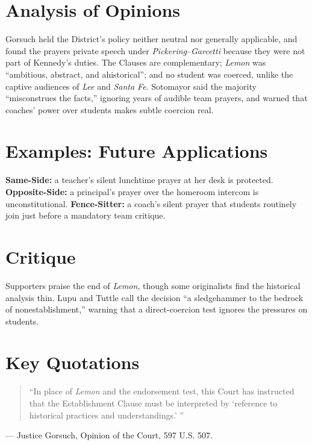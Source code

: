 \documentclass[12pt]{article}
\begin{document}
\section{Analysis of Opinions}
Gorsuch held the District's policy neither neutral nor generally applicable, and found the prayers private speech under \textit{Pickering}--\textit{Garcetti} because they were not part of Kennedy's duties. The Clauses are complementary; \textit{Lemon} was ``ambitious, abstract, and ahistorical''; and no student was coerced, unlike the captive audiences of \textit{Lee} and \textit{Santa Fe}. Sotomayor said the majority ``misconstrues the facts,'' ignoring years of audible team prayers, and warned that coaches' power over students makes subtle coercion real.

\section{Examples: Future Applications}
\textbf{Same-Side:} a teacher's silent lunchtime prayer at her desk is protected. \textbf{Opposite-Side:} a principal's prayer over the homeroom intercom is unconstitutional. \textbf{Fence-Sitter:} a coach's silent prayer that students routinely join just before a mandatory team critique.

\section{Critique}
Supporters praise the end of \textit{Lemon}, though some originalists find the historical analysis thin. Lupu and Tuttle call the decision ``a sledgehammer to the bedrock of nonestablishment,'' warning that a direct-coercion test ignores the pressures on students.

\section{Key Quotations}
\begin{quote}
``In place of \textit{Lemon} and the endorsement test, this Court has instructed that the Establishment Clause must be interpreted by `reference to historical practices and understandings.' ''
\end{quote}
\noindent --- Justice Gorsuch, Opinion of the Court, 597 U.S. 507.
\end{document}
